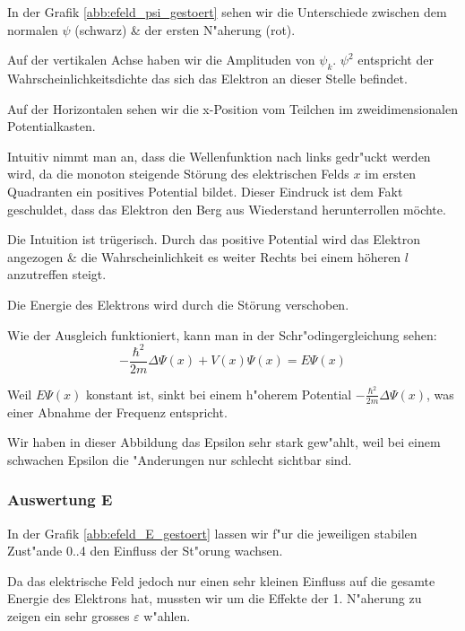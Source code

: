 \begin{refsection}
In der Grafik \ref{abb:efeld_psi_gestoert} sehen wir die Unterschiede zwischen 
dem normalen $\psi$ (schwarz) \& der ersten N"aherung (rot).

Auf der vertikalen Achse haben wir die Amplituden von $\psi_k$.
$\psi^2$ entspricht der Wahrscheinlichkeitsdichte das sich das Elektron an dieser Stelle befindet.

Auf der Horizontalen sehen wir die x-Position vom Teilchen im zweidimensionalen Potentialkasten.

Intuitiv nimmt man an, dass die Wellenfunktion nach links gedr"uckt werden wird, da die monoton steigende St\"orung
des elektrischen Felds $x$ im ersten Quadranten ein positives Potential bildet.
Dieser Eindruck ist dem Fakt geschuldet, dass das Elektron den Berg aus Wiederstand herunterrollen m\"ochte.

Die Intuition ist tr\"ugerisch. Durch das positive Potential wird das Elektron angezogen \& die
Wahrscheinlichkeit es weiter Rechts bei einem h\"oheren $l$ anzutreffen steigt.

Die Energie des Elektrons wird durch die St\"orung verschoben.

Wie der Ausgleich funktioniert, kann man in der Schr"odingergleichung sehen:
\[
-\frac{\hbar^2}{2m}\Delta\Psi(x) + V(x)\Psi(x)
=
E \Psi(x)
\]

Weil $E \Psi(x)$ konstant ist, sinkt bei einem h"oherem Potential $-\frac{\hbar^2}{2m}\Delta\Psi(x)$,
was einer Abnahme der Frequenz entspricht.

Wir haben in dieser Abbildung das Epsilon sehr stark gew"ahlt,
weil bei einem schwachen Epsilon die "Anderungen nur schlecht sichtbar sind.



\subsubsection{Auswertung E}

In der Grafik \ref{abb:efeld_E_gestoert} lassen wir f"ur die jeweiligen stabilen Zust"ande 0..4 
den Einfluss der St"orung wachsen.

Da das elektrische Feld jedoch nur einen sehr kleinen Einfluss auf die gesamte Energie des 
Elektrons hat, mussten wir um die Effekte der 1. N"aherung zu zeigen ein sehr grosses $\varepsilon$
w"ahlen.


\end{refsection}

